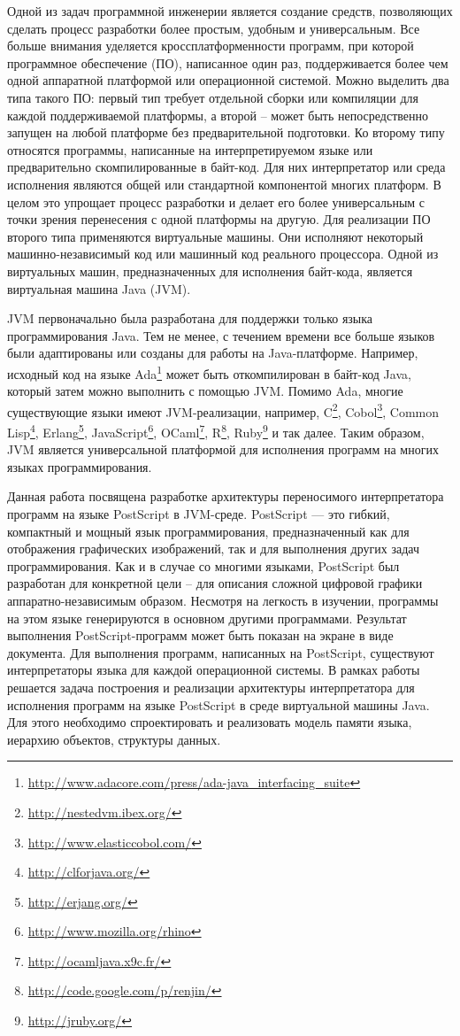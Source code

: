 Одной из задач программной инженерии является создание средств, позволяющих сделать процесс разработки более простым, удобным и универсальным. Все больше внимания уделяется кроссплатформенности программ, при которой программное обеспечение (ПО), написанное один раз, поддерживается более чем одной аппаратной платформой или операционной системой. Можно выделить два типа такого ПО: первый тип требует отдельной сборки или компиляции для каждой поддерживаемой платформы, а второй – может быть непосредственно запущен на любой платформе без предварительной подготовки. Ко второму типу относятся программы, написанные на интерпретируемом языке или предварительно скомпилированные в байт-код. Для них интерпретатор или среда исполнения являются общей или стандартной компонентой многих платформ. В целом это упрощает процесс разработки и делает его более универсальным с точки зрения перенесения с одной платформы на другую.
Для реализации ПО второго типа применяются виртуальные машины. Они исполняют некоторый машинно-независимый код или машинный код реального процессора. Одной из виртуальных машин, предназначенных для исполнения байт-кода, является виртуальная машина Java (JVM)\cite{jvms}.

JVM первоначально была разработана для поддержки только языка программирования Java. Тем не менее, с течением времени все больше языков были адаптированы или созданы  для работы на Java-платформе. Например, исходный код на языке Ada\footnote{\url{http://www.adacore.com/press/ada-java\_interfacing\_suite}} может быть откомпилирован в байт-код Java, который затем можно выполнить с помощью JVM. Помимо Ada, многие существующие языки имеют JVM-реализации, например, C\footnote{\url{http://nestedvm.ibex.org/}}, Cobol\footnote{\url{http://www.elasticcobol.com/}}, Common Lisp\footnote{\url{http://clforjava.org/}}, Erlang\footnote{\url{http://erjang.org/}}, JavaScript\footnote{\url{http://www.mozilla.org/rhino}}, OCaml\footnote{\url{http://ocamljava.x9c.fr/}}, R\footnote{\url{http://code.google.com/p/renjin/}}, Ruby\footnote{\url{http://jruby.org/}} и так далее. Таким образом, JVM является универсальной платформой для исполнения программ на многих языках программирования. 

Данная работа посвящена разработке архитектуры переносимого интерпретатора программ на языке PostScript \cite{plrm} в JVM-среде. PostScript —  это гибкий,  компактный и мощный язык	программирования, предназначенный как для отображения графических изображений, так и для выполнения других задач программирования. Как и в случае со многими языками, PostScript был разработан для конкретной цели – для описания сложной цифровой графики аппаратно-независимым образом. Несмотря на легкость в изучении, программы на этом языке генерируются в основном другими программами. Результат выполнения PostScript-программ может быть показан на экране в виде документа. Для выполнения программ, написанных на PostScript, существуют интерпретаторы языка для каждой  операционной системы.
В рамках работы решается задача построения и реализации архитектуры интерпретатора для исполнения программ на языке PostScript в среде виртуальной машины Java. Для этого необходимо спроектировать и реализовать модель памяти языка, иерархию объектов, структуры данных.

